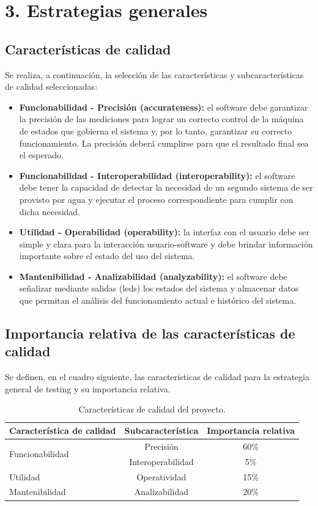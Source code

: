\documentclass[
11pt, %
]{charter}
\begin{document}
 

\section{3. Estrategias generales}
\label{sec:estrategias_generales}
\subsection{Características de calidad}
Se realiza, a continuación, la selección de las características y subcaracterísticas de calidad seleccionadas:

\begin{itemize}
	\item \textbf{Funcionabilidad - Precisión (accurateness):} el software debe garantizar la precisión de las mediciones para lograr un correcto control de la máquina de estados que gobierna el sistema y, por lo tanto, garantizar su correcto funcionamiento. La precisión deberá cumplirse para que el resultado final sea el esperado.
	\item \textbf{Funcionabilidad - Interoperabilidad (interoperability):} el software debe tener la capacidad de detectar la necesidad de un segundo sistema de ser provisto por agua y ejecutar el proceso correspondiente para cumplir con dicha necesidad.
	\item \textbf{Utilidad - Operabilidad (operability):}  la interfaz con el usuario debe ser simple y clara para la interacción usuario-software y debe brindar información importante sobre el estado del uso del sistema.
	\item \textbf{Mantenibilidad - Analizabilidad (analyzability):} el software debe señalizar mediante salidas (leds) los estados del sistema y almacenar datos que permitan el análisis del funcionamiento actual e histórico del sistema.
	
\end{itemize}
\subsection{Importancia relativa de las características de calidad}
Se definen, en el cuadro siguiente, las características de calidad para la estrategia general de testing y su importancia relativa. 

\begin{table}[H]
\centering
\begin{tabular}{|l|c|c|}
\hline
\rowcolor[HTML]{C0C0C0}
Característica de calidad	& Subcaracterística		& Importancia relativa\\ \hline
\multirow{2}{*}{Funcionabilidad} 			& Precisión 		& 60\%	\\\cline{2-3}
  										& Interoperabilidad 	& 5\%							\\ \hline
Utilidad					& Operatividad						& 15\%						\\ \hline
Mantenibilidad				& Analizabilidad					& 20\%						\\ \hline
\end{tabular}
\caption{\centering Características de calidad del proyecto.}
\label{tab:caracteristicasDeCalidad}
\end{table}
\end{document}
